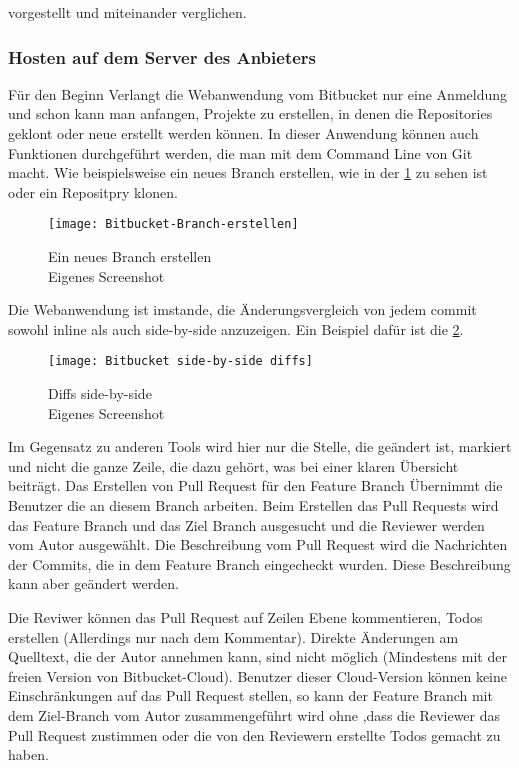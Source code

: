 vorgestellt und miteinander verglichen.

\subsubsection{Hosten auf dem Server des Anbieters}
\label{subsubsec:Bitbucket-Cloud}

Für den Beginn Verlangt die Webanwendung vom Bitbucket nur eine Anmeldung und schon kann man anfangen, Projekte zu erstellen, in denen die Repositories geklont oder neue erstellt werden können. In dieser Anwendung können auch Funktionen durchgeführt werden, die man mit dem Command Line von Git macht. Wie beispielsweise ein neues Branch erstellen, wie in der \cref{fig:Bitbucket-Branch-erstellen} zu sehen ist oder ein Repositpry klonen.

\begin{figure}[H]
	\centering
	\texttt{[image: Bitbucket-Branch-erstellen]}
	\caption[Branch auf Bitbuckets Anwendung erstellen]{Ein neues Branch erstellen\\Eigenes Screenshot}
	\label{fig:Bitbucket-Branch-erstellen}
\end{figure}

Die Webanwendung ist imstande, die Änderungsvergleich von jedem commit sowohl inline als auch side-by-side anzuzeigen. Ein Beispiel dafür ist die \cref{fig:Diffs_side-by-side}.

\begin{figure}[H]
	\centering
	\texttt{[image: Bitbucket side-by-side diffs]}
	\caption[Bitbuckets Webanwendung side-by-side Änerungsvergleich]{Diffs side-by-side\\Eigenes Screenshot}
	\label{fig:Diffs_side-by-side}
\end{figure}

Im Gegensatz zu anderen Tools wird hier nur die Stelle, die geändert ist, markiert und nicht die ganze Zeile, die dazu gehört, was bei einer klaren Übersicht beiträgt.
Das Erstellen von Pull Request für den Feature Branch Übernimmt die Benutzer die an diesem Branch arbeiten. Beim Erstellen das Pull Requests wird das Feature Branch und das Ziel Branch ausgesucht und die Reviewer werden vom Autor ausgewählt. Die Beschreibung vom Pull Request wird die Nachrichten der Commits, die in dem Feature Branch eingecheckt wurden. Diese Beschreibung kann aber geändert werden.

Die Reviwer können das Pull Request auf Zeilen Ebene kommentieren, Todos erstellen (Allerdings nur nach dem Kommentar). Direkte Änderungen am Quelltext, die der Autor annehmen kann, sind nicht möglich (Mindestens mit der freien Version von Bitbucket-Cloud). Benutzer dieser Cloud-Version können keine Einschränkungen auf das Pull Request stellen, so kann der Feature Branch mit dem Ziel-Branch vom Autor zusammengeführt wird ohne ,dass die Reviewer das Pull Request zustimmen oder die von den Reviewern erstellte Todos gemacht zu haben.

